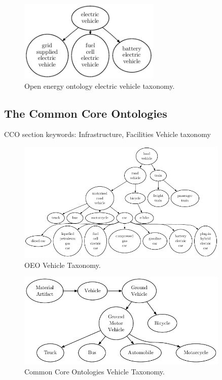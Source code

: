 \begin{figure}[h]
    \caption{Open energy ontology electric vehicle taxonomy.}
    \centering
    \includegraphics[width=0.6\textwidth]{images/OEOVehicles}
\end{figure}

\subsection{The Common Core Ontologies}

CCO section keywords: Infrastructure, Facilities Vehicle taxonomy

\begin{figure}[h]
    \caption{OEO Vehicle Taxonomy.}
    \centering
    \includegraphics[width=0.9\textwidth]{images/OEOLVehicles}
\end{figure}

\begin{figure}[h]
    \caption{Common Core Ontologies Vehicle Taxonomy.}
    \centering
    \includegraphics[width=0.9\textwidth]{images/CCOVehicles}
\end{figure}


